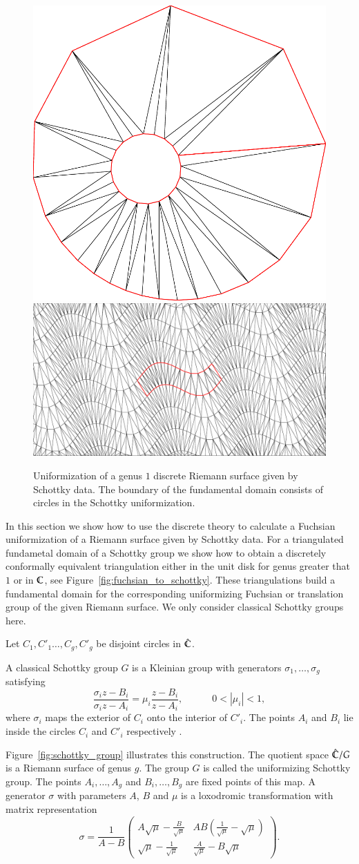 \begin{figure}
	\centering
	\includegraphics[width=0.3\linewidth]{image/schottky/g1_schottky_converted.pdf}
	\quad
	\includegraphics[width=0.6\linewidth]{image/schottky/g1_domain_converted.pdf}
	\caption{Uniformization of a genus $1$ discrete Riemann surface given by Schottky data.
	The boundary of the fundamental domain consists of circles in the Schottky uniformization.}
	\label{fig:fuchsian_to_schottky_genus_1}
\end{figure}

In this section we show how to use the discrete theory to calculate a Fuchsian uniformization of a Riemann surface 
given by Schottky data. For a triangulated fundametal domain of a Schottky group we show how to obtain a discretely
conformally equivalent triangulation either in the unit disk for genus greater that $1$ or in $\mathbb C$, see Figure~\ref{fig:fuchsian_to_schottky}. These triangulations build
a fundamental domain for the corresponding uniformizing Fuchsian or translation group of the given Riemann surface. We only consider classical Schottky groups here.

Let $C_1,C'_1\ldots,C_g,C'_g$ be disjoint circles in $\hat{\mathbb C}$. 
\begin{definition}
A classical Schottky group $G$ is a Kleinian group
with generators $\sigma_1,\ldots,\sigma_g$ satisfying
\[\frac{\sigma_i z - B_i}{\sigma_i z - A_i} = \mu_i \frac{z - B_i}{z - A_i}, \quad\quad\quad 0 < \left|\mu_i\right|<1,\]
where $\sigma_i$ maps the exterior of $C_i$ onto the interior of $C'_i$. The points $A_i$ and $B_i$ lie inside the circles $C_i$ and $C'_i$ respectively \cite{bobenko2011riemann}. 
\end{definition}
Figure~\ref{fig:schottky_group} illustrates this construction.
The quotient space $\hat{\mathbb C}/G$ is a Riemann surface of genus $g$. The group $G$ is called the uniformizing
Schottky group. The points $A_i,\ldots,A_g$ and $B_i,\ldots,B_g$ are fixed points of this map.
A generator $\sigma$ with parameters $A$, $B$ and $\mu$ is a loxodromic transformation with matrix representation 
\[
\sigma = \frac{1}{A-B}
\begin{pmatrix}
	A\sqrt{\mu}-\frac{B}{\sqrt\mu} & AB\left(\frac{1}{\sqrt\mu}-\sqrt{\mu}\right) \\
	\sqrt\mu-\frac{1}{\sqrt\mu} & \frac{A}{\sqrt\mu}-B\sqrt\mu
\end{pmatrix}.
\]

